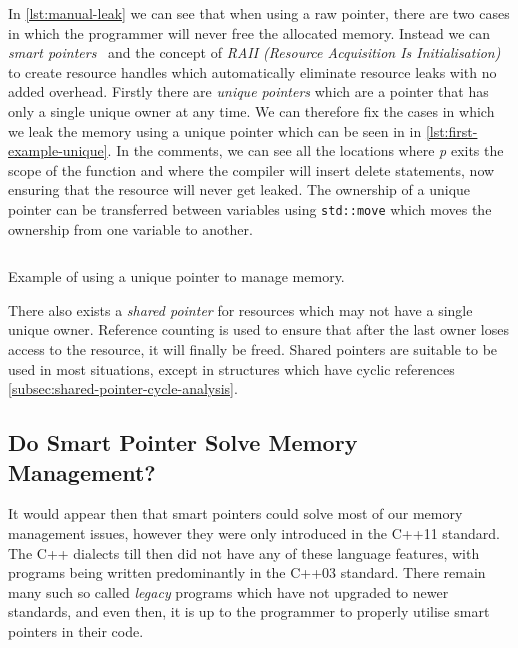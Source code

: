\documentclass{proposal}
\begin{document}
    In \autoref{lst:manual-leak} we can see that when using a raw pointer, there are two cases in which the programmer will never free the allocated memory.
    Instead we can \emph{smart pointers}~\cite{Dimov2003} and the concept of \emph{RAII (Resource Acquisition Is Initialisation)} to create resource handles which automatically eliminate resource leaks with no added overhead.
    Firstly there are \emph{unique pointers} which are a pointer that has only a single unique owner at any time.
    We can therefore fix the cases in which we leak the memory using a unique pointer which can be seen in in \autoref{lst:first-example-unique}.
    In the comments, we can see all the locations where \emph{p} exits the scope of the function and where the compiler will insert delete statements, now ensuring that the resource will never get leaked.
    The ownership of a unique pointer can be transferred between variables using \texttt{std::move} which moves the ownership from one variable to another.

    \begin{listing}
        \inputminted{c++}{code/first-example-unique.cpp}
        \caption{Example of using a unique pointer to manage memory.}
        \label{lst:first-example-unique}
    \end{listing}

    There also exists a \emph{shared pointer} for resources which may not have a single unique owner.
    Reference counting is used to ensure that after the last owner loses access to the resource, it will finally be freed.
    Shared pointers are suitable to be used in most situations, except in structures which have cyclic references \autoref{subsec:shared-pointer-cycle-analysis}.

    \subsection{Do Smart Pointer Solve Memory Management?}\label{subsec:do-smart-pointer-solve-memory-management?}

    It would appear then that smart pointers could solve most of our memory management issues, however they were only introduced in the C++11 standard.
    The C++ dialects till then did not have any of these language features, with programs being written predominantly in the C++03 standard.
    There remain many such so called \emph{legacy} programs which have not upgraded to newer standards, and even then, it is up to the programmer to properly utilise smart pointers in their code.
\end{document}
